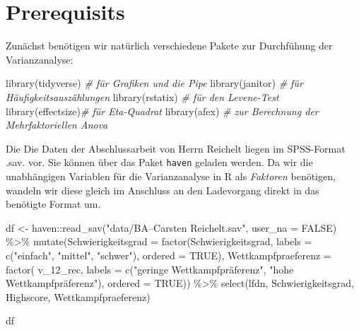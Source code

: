 \documentclass[
]{book}
\newenvironment{Shaded}{\begin{snugshade}}{\end{snugshade}}
\newcommand{\AttributeTok}[1]{\textcolor[rgb]{0.77,0.63,0.00}{#1}}
\newcommand{\CommentTok}[1]{\textcolor[rgb]{0.56,0.35,0.01}{\textit{#1}}}
\newcommand{\ConstantTok}[1]{\textcolor[rgb]{0.00,0.00,0.00}{#1}}
\newcommand{\FunctionTok}[1]{\textcolor[rgb]{0.00,0.00,0.00}{#1}}
\newcommand{\NormalTok}[1]{#1}
\newcommand{\OtherTok}[1]{\textcolor[rgb]{0.56,0.35,0.01}{#1}}
\newcommand{\SpecialCharTok}[1]{\textcolor[rgb]{0.00,0.00,0.00}{#1}}
\newcommand{\StringTok}[1]{\textcolor[rgb]{0.31,0.60,0.02}{#1}}
\begin{document}
\hypertarget{prerequisits}{%
\section{Prerequisits}\label{prerequisits}}

Zunächst benötigen wir natürlich verschiedene Pakete zur Durchfühung der Varianzanalyse:

\begin{Shaded}
\begin{Highlighting}[]
\FunctionTok{library}\NormalTok{(tidyverse) }\CommentTok{\# für Grafiken und die Pipe}
\FunctionTok{library}\NormalTok{(janitor)   }\CommentTok{\# für Häufigkeitsauszählungen}
\FunctionTok{library}\NormalTok{(rstatix)   }\CommentTok{\# für den Levene{-}Test}
\FunctionTok{library}\NormalTok{(effectsize)}\CommentTok{\# für Eta{-}Quadrat}
\FunctionTok{library}\NormalTok{(afex)      }\CommentTok{\# zur Berechnung der Mehrfaktoriellen Anova}
\end{Highlighting}
\end{Shaded}

Die Die Daten der Abschlussarbeit von Herrn Reichelt liegen im SPSS-Format .sav. vor. Sie können über das Paket \texttt{haven} geladen werden. Da wir die unabhängigen Variablen für die Varianzanalyse in R als \emph{Faktoren} benötigen, wandeln wir diese gleich im Anschluss an den Ladevorgang direkt in das benötigte Format um.

\begin{Shaded}
\begin{Highlighting}[]
\NormalTok{df }\OtherTok{\textless{}{-}}\NormalTok{ haven}\SpecialCharTok{::}\FunctionTok{read\_sav}\NormalTok{(}\StringTok{"data/BA–Carsten Reichelt.sav"}\NormalTok{, }\AttributeTok{user\_na =} \ConstantTok{FALSE}\NormalTok{) }\SpecialCharTok{\%\textgreater{}\%} 
  \FunctionTok{mutate}\NormalTok{(}\AttributeTok{Schwierigkeitsgrad =} \FunctionTok{factor}\NormalTok{(Schwierigkeitsgrad, }
                                     \AttributeTok{labels =} \FunctionTok{c}\NormalTok{(}\StringTok{"einfach"}\NormalTok{, }\StringTok{"mittel"}\NormalTok{, }\StringTok{"schwer"}\NormalTok{), }
                                     \AttributeTok{ordered =} \ConstantTok{TRUE}\NormalTok{),}
         \AttributeTok{Wettkampfpraeferenz =} \FunctionTok{factor}\NormalTok{( v\_12\_rec,}
                                       \AttributeTok{labels =} \FunctionTok{c}\NormalTok{(}\StringTok{"geringe Wettkampfpräferenz"}\NormalTok{, }\StringTok{"hohe Wettkampfpräferenz"}\NormalTok{),}
                                       \AttributeTok{ordered =} \ConstantTok{TRUE}\NormalTok{)) }\SpecialCharTok{\%\textgreater{}\%} 
  \FunctionTok{select}\NormalTok{(lfdn, Schwierigkeitsgrad, Highscore, Wettkampfpraeferenz)}

\NormalTok{df}
\end{Highlighting}
\end{Shaded}
\end{document}
